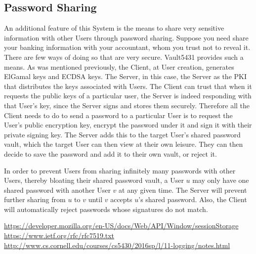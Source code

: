 \documentclass{article}
\begin{document}
\subsection{Password Sharing}
\par An additional feature of this System is the means to share very sensitive information with other Users through password sharing. Suppose you need share your banking information with your accountant, whom you trust not to reveal it. There are few ways of doing so that are very secure. Vault5431 provides such a means. As was mentioned previously, the Client, at User creation, generates ElGamal keys and ECDSA keys. The Server, in this case, the Server as the PKI that distributes the keys associated with Users. The Client can trust that when it requests the public keys of a particular user, the Server is indeed responding with that User's key, since the Server signs and stores them securely. Therefore all the Client needs to do to send a password to a particular User is to request the User's public encryption key, encrypt the password under it and sign it with their private signing key. The Server adds this to the target User's shared password vault, which the target User can then view at their own leisure. They can then decide to save the password and add it to their own vault, or reject it.
\par In order to prevent Users from sharing infinitely many passwords with other Users, thereby bloating their shared password vault, a User $u$ may only have one shared password with another User $v$ at any given time. The Server will prevent further sharing from $u$ to $v$ until $v$ accepts $u$'s shared password. Also, the Client will automatically reject passwords whose signatures do not match.

\begin{thebibliography}{30}
    \url{https://developer.mozilla.org/en-US/docs/Web/API/Window/sessionStorage}
    \url{https://www.ietf.org/rfc/rfc7519.txt}
    \url{http://www.cs.cornell.edu/courses/cs5430/2016sp/l/11-logging/notes.html}
\end{thebibliography}
\end{document}
